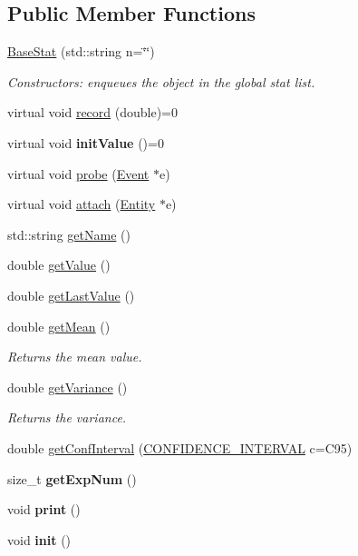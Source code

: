 \subsection*{Public Member Functions}
\begin{DoxyCompactItemize}
\item 
\hyperlink{group__metasim__stat_ga53f0b2d86cefc177d2c6c8960fb96ad9}{Base\+Stat} (std\+::string n=\char`\"{}\char`\"{})
\begin{DoxyCompactList}\small\item\em Constructors\+: enqueues the object in the global stat list. \end{DoxyCompactList}\item 
virtual void \hyperlink{group__metasim__stat_gabf9c73112c72defa99961982da53fb71}{record} (double)=0
\item 
virtual void {\bfseries init\+Value} ()=0
\item 
virtual void \hyperlink{group__metasim__stat_ga26159e56ee45dc6d8e1413bf7e54ecbe}{probe} (\hyperlink{classMetaSim_1_1Event}{Event} $\ast$e)
\item 
virtual void \hyperlink{group__metasim__stat_gaf5584d4aefc280eb644997fd13f8cd3d}{attach} (\hyperlink{classMetaSim_1_1Entity}{Entity} $\ast$e)
\item 
std\+::string \hyperlink{group__metasim__stat_ga4aa54dc810a8178ce3c1bcd13e3f1f00}{get\+Name} ()
\item 
double \hyperlink{group__metasim__stat_ga1c038c3cad17287ae59680a62e1301a9}{get\+Value} ()
\item 
double \hyperlink{group__metasim__stat_ga44f5a2cda5f88cf941c1cedbc40c3e19}{get\+Last\+Value} ()
\item 
double \hyperlink{group__metasim__stat_ga3300f3a76af416db83cff8d67ace7561}{get\+Mean} ()
\begin{DoxyCompactList}\small\item\em Returns the mean value. \end{DoxyCompactList}\item 
double \hyperlink{group__metasim__stat_gad2e53ad4a56f37c4d400f3932e9d4671}{get\+Variance} ()
\begin{DoxyCompactList}\small\item\em Returns the variance. \end{DoxyCompactList}\item 
double \hyperlink{group__metasim__stat_ga27e74d139c9f265aa0d6427ed2d546f8}{get\+Conf\+Interval} (\hyperlink{group__metasim__stat_ga4d14ae31bff47d98dc795b118c8b2ccd}{C\+O\+N\+F\+I\+D\+E\+N\+C\+E\+\_\+\+I\+N\+T\+E\+R\+V\+AL} c=C95)
\item 
size\+\_\+t {\bfseries get\+Exp\+Num} ()
\item 
void {\bfseries print} ()
\item 
void {\bfseries init} ()
\end{DoxyCompactItemize}
